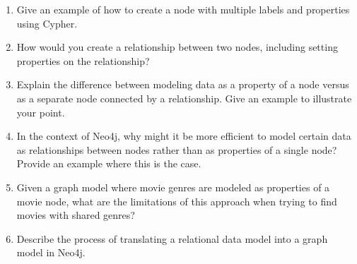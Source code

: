 \begin{enumerate}[nosep]
	\item Give an example of how to create a node with multiple labels and properties using Cypher.
	\item How would you create a relationship between two nodes, including setting properties on the relationship?
	\item Explain the difference between modeling data as a property of a node versus as a separate node connected by a relationship. Give an example to illustrate your point.
	\item In the context of Neo4j, why might it be more efficient to model certain data as relationships between nodes rather than as properties of a single node? Provide an example where this is the case.
	\item Given a graph model where movie genres are modeled as properties of a movie node, what are the limitations of this approach when trying to find movies with shared genres?
	\item Describe the process of translating a relational data model into a graph model in Neo4j.
\end{enumerate}


